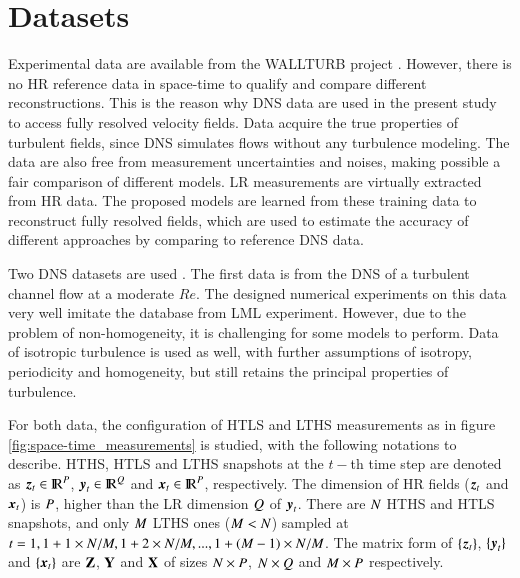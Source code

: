 \section{Datasets}
Experimental data are available from the WALLTURB project \citep{coudert2011double}. However, there is no HR reference data in space-time to qualify and compare different reconstructions. This is the reason why DNS data are used in the present study to access fully resolved velocity fields. Data acquire the true properties of turbulent fields, since DNS simulates flows without any turbulence modeling. The data are also free from measurement uncertainties and noises, making possible a fair comparison of different models. LR measurements are virtually extracted from HR data. The proposed models are learned from these training data to reconstruct fully resolved fields, which are used to estimate the accuracy of different approaches by comparing to reference DNS data.

Two DNS datasets are used . The first data is from the DNS of a turbulent channel flow at a moderate $ Re $. The designed numerical experiments on this data very well imitate the database from LML experiment. However, due to the problem of non-homogeneity, it is challenging for some models to perform. Data of isotropic turbulence is used as well, with further assumptions of isotropy, periodicity and homogeneity, but still retains the principal properties of turbulence.

For both data, the configuration of HTLS and LTHS measurements as in figure \ref{fig:space-time_measurements} is studied, with the following notations to describe. HTHS, HTLS and LTHS snapshots at the $ t-$th time step are denoted as $ \operatorname{\boldsymbol{z}}_t \in {\rm I\!R}^{P} $, $ \operatorname{\boldsymbol{y}}_t \in {\rm I\!R}^{Q} $ and $ \operatorname{\boldsymbol{x}}_t \in {\rm I\!R}^{P} $, respectively. The dimension of HR fields ($ \operatorname{\boldsymbol{z}}_t $ and $ \operatorname{\boldsymbol{x}}_t $) is $ P $, higher than the LR dimension $ Q $ of $ \operatorname{\boldsymbol{y}}_t $. There are $ N $ HTHS and HTLS snapshots, and only $ M $ LTHS ones ($ M < N $) sampled at $ t=1,1+1 \times N/M,1+2 \times N/M,...,1+(M-1)\times N/M $. The matrix form of $ \{\operatorname{\boldsymbol{z}}_t\} $, $ \{\operatorname{\boldsymbol{y}}_t\} $ and $ \{\operatorname{\boldsymbol{x}}_t\} $ are $ \mathbf{Z} $, $ \mathbf{Y} $ and $ \mathbf{X} $ of sizes $ N \times P $, $ N \times Q $ and $ M \times P $ respectively. 

